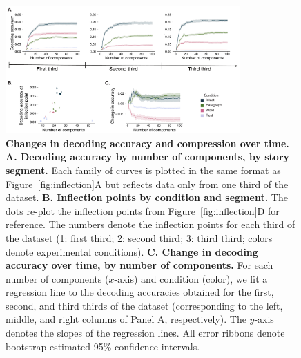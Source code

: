 \documentclass[english, 11pt]{article}
\begin{document}
\begin{figure}
  \centering
  \includegraphics[width=0.8\textwidth]{figs/information_and_compression_over_time}

\caption{\textbf{Changes in decoding accuracy and compression over time.}
\textbf{A. Decoding accuracy by number of components, by story segment.} Each
family of curves is plotted in the same format as Figure~\ref{fig:inflection}A
but reflects data only from one third of the dataset. \textbf{B. Inflection
points by condition and segment.} The dots re-plot the inflection points from
Figure~\ref{fig:inflection}D for reference. The numbers denote the inflection
points for each third of the dataset (1: first third; 2: second third; 3: third
third; colors denote experimental conditions). \textbf{C. Change in decoding
accuracy over time, by number of components.} For each number of components
($x$-axis) and condition (color), we fit a regression line to the decoding
accuracies obtained for the first, second, and third thirds of the dataset
(corresponding to the left, middle, and right columns of Panel A,
respectively). The $y$-axis denotes the slopes of the regression lines. All
error ribbons denote bootstrap-estimated 95\% confidence intervals.}

\label{fig:inflection-thirds}

\end{figure}
\end{document}
